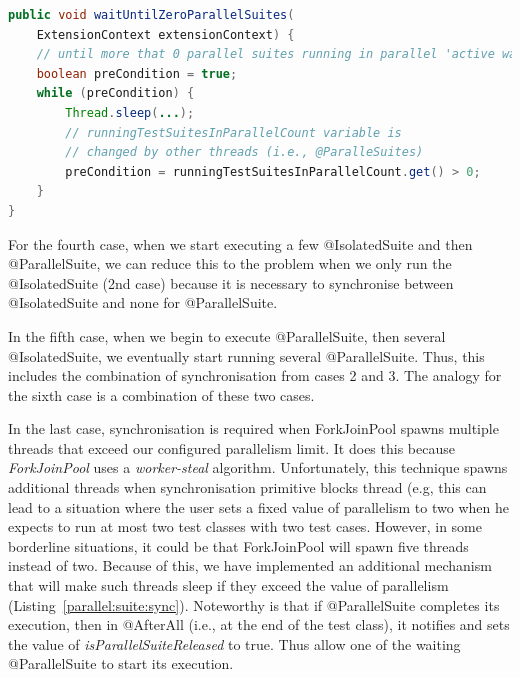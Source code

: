 \begin{lstlisting}[language=Java,label=parallelsuite:isolatedsuite:sync,caption=@ParallelSuite and @IsolatedSuite synchronisation mechanism,frame=tb]
public void waitUntilZeroParallelSuites(
    ExtensionContext extensionContext) {
    // until more that 0 parallel suites running in parallel 'active waiting'
    boolean preCondition = true;
    while (preCondition) {
        Thread.sleep(...);
        // runningTestSuitesInParallelCount variable is
        // changed by other threads (i.e., @ParalleSuites)
        preCondition = runningTestSuitesInParallelCount.get() > 0;
    }
}
\end{lstlisting}

For the fourth case, when we start executing a few @IsolatedSuite and then @ParallelSuite, we can reduce this to the problem when we only run the @IsolatedSuite (2nd case) because it is necessary to synchronise between @IsolatedSuite
and none for @ParallelSuite.

In the fifth case, when we begin to execute @ParallelSuite, then several @IsolatedSuite, we eventually start running several
@ParallelSuite. Thus, this includes the combination of synchronisation from cases 2 and 3.
The analogy for the sixth case is a combination of these two cases.

In the last case, synchronisation is required when ForkJoinPool spawns multiple threads that exceed our configured parallelism limit.
It does this because \emph{ForkJoinPool} uses a \emph{worker-steal} algorithm. Unfortunately, this technique spawns additional threads when
synchronisation primitive blocks thread (e.g, this can lead to a situation where the user sets a fixed value of parallelism
to two when he expects to run at most two test classes with two test cases. However, in some borderline situations,
it could be that ForkJoinPool will spawn five threads instead of two. Because of this, we have implemented an additional
mechanism that will make such threads sleep if they exceed the value of parallelism (Listing~\ref{parallel:suite:sync}).
Noteworthy is that if @ParallelSuite completes its execution, then in @AfterAll (i.e., at the end of the test class),
it notifies and sets the value of \emph{isParallelSuiteReleased} to true. Thus allow one of the waiting @ParallelSuite to start its execution.

